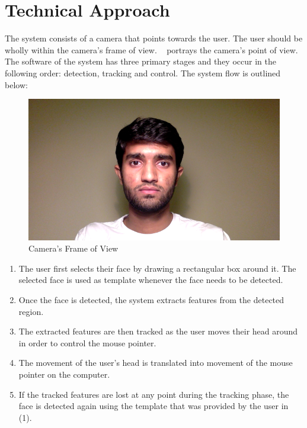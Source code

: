 \section{Technical Approach}
\label{sec:techapp}

The system consists of a camera that points towards the user. The user should be wholly within the camera's frame of view. ~ portrays the camera's point of view. The software of the system has three primary stages and they occur in the following order: detection, tracking and control. The system flow is outlined below:

\begin{figure}[htbp]
	\begin{center}
		\includegraphics[width=\textwidth]{pics/cameraView.png}
	\end{center}%
	\caption{Camera's Frame of View}
	\label{fig:camview}
\end{figure}%

\begin{enumerate}
	\item The user first selects their face by drawing a rectangular box around it. The selected face is used as template whenever the face needs to be detected.
	\item Once the face is detected, the system extracts features from the detected region.
	\item The extracted features are then tracked as the user moves their head around in order to control the mouse pointer.
	\item The movement of the user's head is translated into movement of the mouse pointer on the computer.
	\item If the tracked features are lost at any point during the tracking phase, the face is detected again using the template that was provided by the user in (1).
\end{enumerate}

